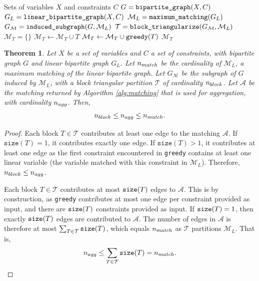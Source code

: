 \documentclass[10pt,a4paper]{amsart}
\newtheorem{theorem}{Theorem}
\newcommand{\rev}[1]{{#1}}
\begin{document}
\begin{algorithm}
  \caption{: {\tt linear\_matching\_aggregation\_set}}
  \begin{algorithmic}[1]
     Sets of variables $X$ and constraints $C$
    \State $G = \text{\tt bipartite\_graph}(X, C)$
    \State $G_L = \text{\tt linear\_bipartite\_graph}(X, C)$
    \State $\mathcal{M}_L = \text{\tt maximum\_matching}(G_L)$
    \State $G_\mathcal{M} = \text{\tt induced\_subgraph}(G, \mathcal{M}_L)$
    \State $\mathcal{T} = \text{\tt block\_triangularize}(G_\mathcal{M}, \mathcal{M}_L)$
    \State $\mathcal{M}_T = \{\}$
        \State $\mathcal{M}_T \gets \mathcal{M}_T \cup T$
      \Else                                      
        \State $\mathcal{M}_T \gets \mathcal{M}_T \cup \text{\tt greedy}(T)$
      \EndIf
    \EndFor
     $\mathcal{M}_T$
  \end{algorithmic}
  \label{alg:matching}
\end{algorithm}

\begin{theorem}
  Let $X$ be a set of variables and $C$ a set of constraints, with bipartite graph $G$
  and linear bipartite graph $G_L$. Let $n_{\rm match}$ be the cardinality of $\mathcal{M}_L$,
  a maximum matching of the linear bipartite graph. Let $G_\mathcal{M}$ be the subgraph
  of $G$ induced by $\mathcal{M}_L$, with a block triangular partition $\mathcal{T}$
  of cardinality $n_{\rm block}$. Let $\mathcal{A}$ be the matching returned by Algorithm
  \ref{alg:matching} that is used for aggregation, with cardinality $n_{\rm agg}$.
  Then\rev{,}
  \[n_{\rm block} \leq n_{\rm agg} \leq n_{\rm match}\rev{.}\]
  \label{thm:matching-bounds}
\end{theorem}

\begin{proof}
  Each block $T\in \mathcal{T}$ contributes at least one edge to the matching $\mathcal{A}$.
  If $\texttt{size}(T)=1$, it contributes exactly one edge. If $\texttt{size}(T) > 1$, it
  contributes at least one edge as the first constraint encountered in
  {\tt greedy} contains at least one linear variable (the variable matched with
  this constraint in $\mathcal{M}_L$).
  Therefore, $n_{\rm block} \leq n_{\rm agg}$.

  Each block $T\in \mathcal{T}$ contributes at most ${\tt size}(T)$ edges to $\mathcal{A}$.
  This is by construction, as {\tt greedy} contributes at most one edge per
  constraint provided as input, and there are ${\tt size}(T)$ constraints provided as
  input. If ${\tt size}(T)=1$, then exactly ${\tt size}(T)$ edges are contributed to
  $\mathcal{A}$. The number of edges in $\mathcal{A}$ is therefore at most 
  $\sum_{T\in \mathcal{T}} {\tt size}(T)$, which equals $n_{\rm match}$ as $\mathcal{T}$
  partitions $\mathcal{M}_L$. That is,
  \[n_{\rm agg} \leq \sum_{T\in \mathcal{T}} {\tt size}(T) = n_{\rm match}\rev{.}\]
\end{proof}
\end{document}
